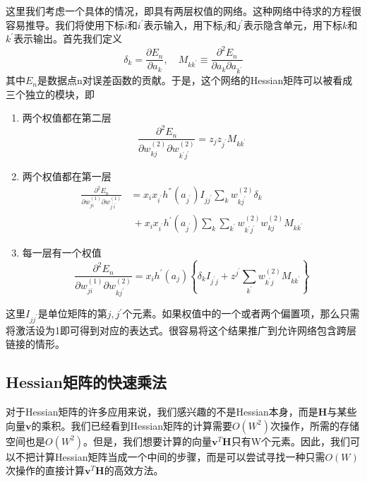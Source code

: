 这里我们考虑一个具体的情况，即具有两层权值的网络。这种网络中待求的方程很容易推导。我们将使用下标$i$和$i^{'}$表示输入，用下标$j$和$j^{'}$表示隐含单元，用下标$k$和$k^{'}$表示输出。首先我们定义 
\begin{equation}
	\delta_k=\frac{\partial E_n}{\partial a_k},\quad M_{kk^{'}}\equiv \frac{\partial^2 E_n}{\partial a_k \partial a_{k^{'}}}
\end{equation}
其中$E_n$是数据点n对误差函数的贡献。于是，这个网络的Hessian矩阵可以被看成三个独立的模块，即
\begin{enumerate}
	\item 两个权值都在第二层
	\begin{equation}
		\frac{\partial ^2E_n}{\partial w_{kj}^{(2)}\partial w_{k^{'}j^{'}}^{(2)}}=z_jz_{j^{'}}M_{kk^{'}}
	\end{equation}
	\item 两个权值都在第一层
	\begin{equation}
		\begin{aligned}
			\frac{\partial ^2E_n}{\partial w_{ji}^{(1)}\partial w_{j^{'}i^{'}}^{(1)}}&=x_ix_{i^{'}}h^{''}(a_{j^{'}})I_{jj^{'}}\sum_{k}w_{kj^{'}}^{(2)}\delta_k\\
			&\ +x_ix_{i^{'}}h^{'}(a_{j^{'}})\sum_{k}\sum_{k^{'}}w_{k^{'}j^{'}}^{(2)}w_{kj}^{(2)}M_{kk^{'}}
		\end{aligned}
	\end{equation}
	\item 每一层有一个权值
	\begin{equation}
		\frac{\partial ^2E_n}{\partial w_{ji}^{(1)}\partial w_{kj^{'}}^{(2)}}=x_ih^{'}(a_j)\left\{\delta_kI_{j^{'}j}+z^{j^{'}}\sum_{k^{'}}w_{k^{'}j}^{(2)}M_{kk^{'}} \right\}
	\end{equation}
\end{enumerate}
这里$I_{jj^{'}}$是单位矩阵的第$j,j^{'}$个元素。如果权值中的一个或者两个偏置项，那么只需将激活设为1即可得到对应的表达式。很容易将这个结果推广到允许网络包含跨层链接的情形。
\subsection*{Hessian矩阵的快速乘法}
对于Hessian矩阵的许多应用来说，我们感兴趣的不是Hessian本身，而是$\boldsymbol{H}$与某些向量$\boldsymbol{v}$的乘积。我们已经看到Hessian矩阵的计算需要$O(W^2)$次操作，所需的存储空间也是$O(W^2)$。但是，我们想要计算的向量$\boldsymbol{v}^T\boldsymbol{H}$只有W个元素。因此，我们可以不把计算Hessian矩阵当成一个中间的步骤，而是可以尝试寻找一种只需$O(W)$次操作的直接计算$\boldsymbol{v}^T\boldsymbol{H}$的高效方法。

